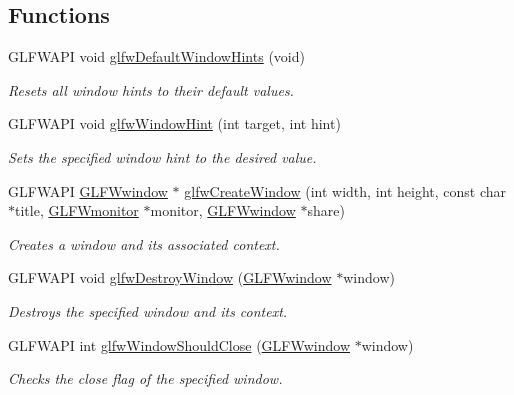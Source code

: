 \subsection*{\-Functions}
\begin{DoxyCompactItemize}
\item 
\-G\-L\-F\-W\-A\-P\-I void \hyperlink{group__window_ga8050ddceed9dc6bd9d3aa35666195cd4}{glfw\-Default\-Window\-Hints} (void)
\begin{DoxyCompactList}\small\item\em \-Resets all window hints to their default values. \end{DoxyCompactList}\item 
\-G\-L\-F\-W\-A\-P\-I void \hyperlink{group__window_gab6e60483d79175b868d6d4dc1dcc63e2}{glfw\-Window\-Hint} (int target, int hint)
\begin{DoxyCompactList}\small\item\em \-Sets the specified window hint to the desired value. \end{DoxyCompactList}\item 
\-G\-L\-F\-W\-A\-P\-I \hyperlink{group__window_ga3c96d80d363e67d13a41b5d1821f3242}{\-G\-L\-F\-Wwindow} $\ast$ \hyperlink{group__window_ga680a02abe0e4494b6759d5703240713e}{glfw\-Create\-Window} (int width, int height, const char $\ast$title, \hyperlink{group__monitor_ga8d9efd1cde9426692c73fe40437d0ae3}{\-G\-L\-F\-Wmonitor} $\ast$monitor, \hyperlink{group__window_ga3c96d80d363e67d13a41b5d1821f3242}{\-G\-L\-F\-Wwindow} $\ast$share)
\begin{DoxyCompactList}\small\item\em \-Creates a window and its associated context. \end{DoxyCompactList}\item 
\-G\-L\-F\-W\-A\-P\-I void \hyperlink{group__window_ga806747476b7247d292be3711c323ea10}{glfw\-Destroy\-Window} (\hyperlink{group__window_ga3c96d80d363e67d13a41b5d1821f3242}{\-G\-L\-F\-Wwindow} $\ast$window)
\begin{DoxyCompactList}\small\item\em \-Destroys the specified window and its context. \end{DoxyCompactList}\item 
\-G\-L\-F\-W\-A\-P\-I int \hyperlink{group__window_gaa6162f67dfa38b8beda2fea623649332}{glfw\-Window\-Should\-Close} (\hyperlink{group__window_ga3c96d80d363e67d13a41b5d1821f3242}{\-G\-L\-F\-Wwindow} $\ast$window)
\begin{DoxyCompactList}\small\item\em \-Checks the close flag of the specified window. \end{DoxyCompactList}\item 

\end{DoxyCompactItemize}
